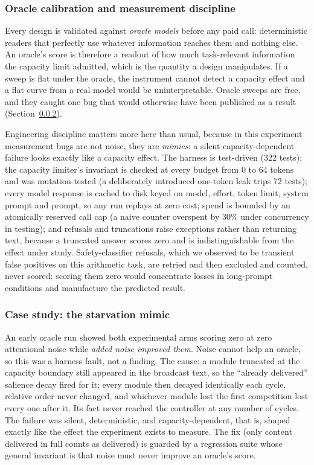 \documentclass[11pt]{article}
\begin{document}
\subsubsection{Oracle calibration and measurement discipline}
\label{sec:discipline}

Every design is validated against \emph{oracle models} before any paid call:
deterministic readers that perfectly use whatever information reaches them and
nothing else. An oracle's score is therefore a readout of how much task-relevant
information the capacity limit admitted, which is the quantity a design
manipulates. If a sweep is flat under the oracle, the instrument cannot detect a
capacity effect and a flat curve from a real model would be uninterpretable.
Oracle sweeps are free, and they caught one bug that would otherwise have been
published as a result (Section~\ref{sec:starvation}).

Engineering discipline matters more here than usual, because in this experiment
measurement bugs are not noise, they are \emph{mimics}: a silent
capacity-dependent failure looks exactly like a capacity effect. The harness is
test-driven (322 tests); the capacity limiter's invariant is checked at every
budget from 0 to 64 tokens and was mutation-tested (a deliberately introduced
one-token leak trips 72 tests); every model response is cached to disk keyed on
model, effort, token limit, system prompt and prompt, so any run replays at zero
cost; spend is bounded by an atomically reserved call cap (a naive counter
overspent by 30\% under concurrency in testing); and refusals and truncations
raise exceptions rather than returning text, because a truncated answer scores
zero and is indistinguishable from the effect under study. Safety-classifier
refusals, which we observed to be transient false positives on this arithmetic
task, are retried and then excluded and counted, never scored: scoring them zero
would concentrate losses in long-prompt conditions and manufacture the predicted
result.

\subsubsection{Case study: the starvation mimic}
\label{sec:starvation}

An early oracle run showed both experimental arms scoring zero at zero attentional
noise while \emph{added noise improved them}. Noise cannot help an oracle, so this
was a harness fault, not a finding. The cause: a module truncated at the capacity
boundary still appeared in the broadcast text, so the ``already delivered'' salience
decay fired for it; every module then decayed identically each cycle, relative
order never changed, and whichever module lost the first competition lost every
one after it. Its fact never reached the controller at any number of cycles. The
failure was silent, deterministic, and capacity-dependent, that is, shaped exactly
like the effect the experiment exists to measure. The fix (only content delivered
in full counts as delivered) is guarded by a regression suite whose general
invariant is that noise must never improve an oracle's score.
\end{document}
